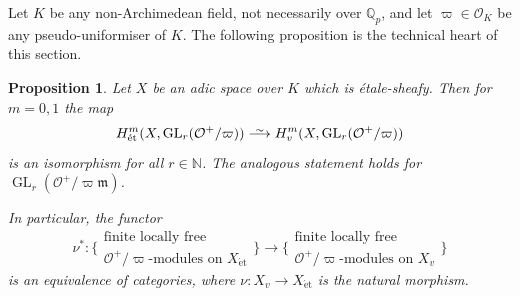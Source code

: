 \documentclass[10pt,a4paper]{article}
\newtheorem{Proposition}[thm]{Proposition}
\theoremstyle{definition}
\theoremstyle{remark}
\newcommand{\lra}{\longrightarrow}
\newcommand*{\lowsim}{\vbox to 0pt{\vss\hbox{$\scriptstyle\sim$}\vskip-2pt}}
\newcommand*{\longisomarrow}{\stackrel{\lowsim}{\lra}}
\newcommand{\N}{\mathbb{N}}
\renewcommand{\O}{\mathcal{O}}
\newcommand{\Q}{\mathbb{Q}}
\newcommand{\m}{\mathfrak{m}}
\newcommand{\GL}{\operatorname{GL}}
\newcommand{\et}{{\operatorname{\acute{e}t}}}
\numberwithin{equation}{section}
\begin{document}
\medskip

Let $K$ be any non-Archimedean field, not necessarily over $\Q_p$, and let $\varpi\in \O_K$ be any pseudo-uniformiser of $K$. The following proposition is the technical heart of this section. 

\begin{Proposition}\label{p:H^1-GL_n-mod-p-agrees-for-et-and-v}
	Let $X$ be an adic space over $K$ which is \'etale-sheafy.  Then for $m=0,1$ the map
	\begin{equation}\label{eq:H^mGL}
	H^m_{\et}(X,\GL_r(\O^+/\varpi))\longisomarrow H^m_{v}(X,\GL_r(\O^+/\varpi))
	\end{equation}
	is an isomorphism for all $r\in \N$. The analogous statement holds for $\GL_r(\O^+/\varpi\m)$.  
	
	In particular, the functor
	\[\nu^{\ast}\colon \Big\{ \begin{array}{c}\text{finite locally free}\\\text{$\O^+/\varpi$-modules on $X_\et$}\end{array}\Big\}\lra \Big\{ \begin{array}{c}\text{finite locally free}\\\text{$\O^+/\varpi$-modules on $X_v$}\end{array}\Big\}\]
	is an equivalence of categories, where $\nu\colon X_v\to X_{\et}$ is the natural morphism.
 \end{Proposition}
\end{document}
